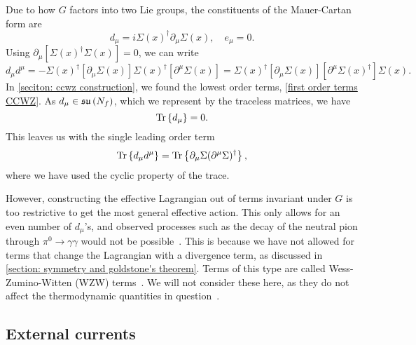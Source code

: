 %
Due to how $G$ factors into two Lie groups, the constituents of the Mauer-Cartan form are 
%
\begin{equation}
    d_\mu = i \Sigma(x)^\dagger \partial_\mu \Sigma(x),\quad
    e_\mu = 0.
\end{equation}
%
Using $\partial_\mu [\Sigma(x)^\dagger\Sigma(x)] = 0 $, we can write
\begin{equation}
    d_\mu d^\mu = 
    - \Sigma(x)^\dagger [\partial_\mu \Sigma(x)] \Sigma(x)^\dagger [\partial^\mu \Sigma(x)]
    =\Sigma(x)^\dagger [\partial_\mu \Sigma(x)] [\partial^\mu \Sigma(x)^\dagger] \Sigma(x).
\end{equation}
%
In \autoref{seciton: ccwz construction}, we found the lowest order terms, \autoref{first order terms CCWZ}.
As $d_\mu \in \mathfrak{su}\left(N_f\right)$, which we represent by the traceless matrices, we have
%
\begin{equation}
    \text{Tr} \left\{ d_\mu \right\} = 0.
\end{equation}
%
This leaves us with the single leading order term
\begin{equation}
    \text{Tr} \left\{ d_\mu d^\mu \right\} = \text{Tr} \left\{ \partial_\mu \Sigma (\partial^\mu \Sigma)^\dagger \right\},
\end{equation}
%
where we have used the cyclic property of the trace.


However, constructing the effective Lagrangian out of terms invariant under $G$ is too restrictive to get the most general effective action.
This only allows for an even number of $d_\mu$'s, and observed processes such as the decay of the neutral pion through $\pi^0 \rightarrow \gamma \gamma$ would not be possible~\cite{schererIntroductionChiralPerturbation2002}.
This is because we have not allowed for terms that change the Lagrangian with a divergence term, as discussed in \autoref{section: symmetry and goldstone's theorem}.
Terms of this type are called Wess-Zumino-Witten (WZW) terms~\cite{weinbergQuantumTheoryFields1996}.
We will not consider these here, as they do not affect the thermodynamic quantities in question~\cite{adhikariTwoflavorChiralPerturbation2019}.

\subsection{External currents}


